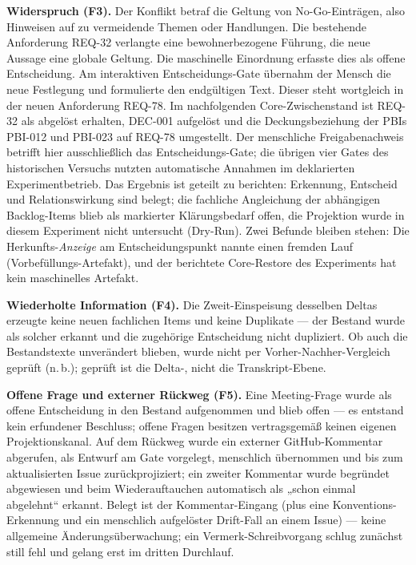 \textbf{Widerspruch (F3).} Der Konflikt betraf die Geltung von
No-Go-Einträgen, also Hinweisen auf zu vermeidende Themen oder
Handlungen. Die bestehende Anforderung REQ-32 verlangte eine
bewohnerbezogene Führung, die neue Aussage eine globale Geltung.
Die maschinelle Einordnung erfasste dies als offene Entscheidung.
Am interaktiven Entscheidungs-Gate übernahm der Mensch die neue
Festlegung und formulierte den endgültigen Text. Dieser steht
wortgleich in der neuen Anforderung REQ-78. Im nachfolgenden
Core-Zwischenstand ist REQ-32 als abgelöst erhalten, DEC-001
aufgelöst und die Deckungsbeziehung der PBIs PBI-012 und PBI-023
auf REQ-78 umgestellt. Der menschliche Freigabenachweis betrifft
hier ausschließlich das Entscheidungs-Gate; die übrigen vier
Gates des historischen Versuchs nutzten automatische Annahmen
im deklarierten Experimentbetrieb.
Das Ergebnis ist geteilt zu berichten: Erkennung,
Entscheid und Relationswirkung sind belegt; die fachliche
Angleichung der abhängigen Backlog-Items blieb als markierter
Klärungsbedarf offen, die Projektion wurde in diesem Experiment
nicht untersucht (Dry-Run). Zwei Befunde bleiben stehen: Die
Herkunfts-\emph{Anzeige} am Entscheidungspunkt nannte einen
fremden Lauf (Vorbefüllungs-Artefakt), und der berichtete
Core-Restore des Experiments hat kein maschinelles Artefakt.

\textbf{Wiederholte Information (F4).} Die Zweit-Einspeisung
desselben Deltas erzeugte keine neuen fachlichen Items und keine
Duplikate --- der Bestand wurde als solcher erkannt und die
zugehörige Entscheidung nicht dupliziert. Ob auch die
Bestandstexte unverändert blieben, wurde nicht per
Vorher-Nachher-Vergleich geprüft (n.\,b.); geprüft ist die
Delta-, nicht die Transkript-Ebene.

\textbf{Offene Frage und externer Rückweg (F5).} Eine
Meeting-Frage wurde als offene Entscheidung in den Bestand
aufgenommen und blieb offen --- es entstand kein erfundener
Beschluss; offene Fragen besitzen vertragsgemäß keinen eigenen
Projektionskanal. Auf dem Rückweg wurde ein externer
GitHub-Kommentar abgerufen, als Entwurf am Gate vorgelegt,
menschlich übernommen und bis zum aktualisierten Issue
zurückprojiziert; ein zweiter Kommentar wurde begründet abgewiesen
und beim Wiederauftauchen automatisch als „schon einmal
abgelehnt`` erkannt. Belegt ist der Kommentar-Eingang
(plus eine Konventions-Erkennung und ein menschlich aufgelöster
Drift-Fall an einem Issue) --- keine allgemeine
Änderungsüberwachung; ein Vermerk-Schreibvorgang schlug zunächst
still fehl und gelang erst im dritten Durchlauf.


